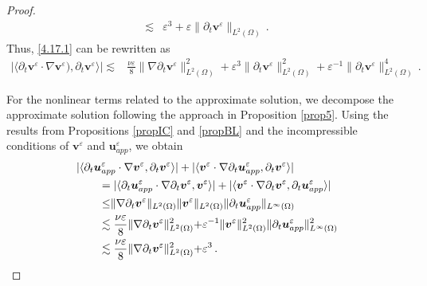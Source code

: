 \documentclass[pdflatex,sn-mathphys-num]{sn-jnl}%
\theoremstyle{thmstyleone}%
\theoremstyle{thmstyletwo}%
\theoremstyle{thmstylethree}%
\theoremstyle{thmstyletwo}
\begin{document}
\begin{proof}
\begin{align}
		\lesssim&\varepsilon^3 
		+
		\varepsilon 
		\lVert\partial_t\boldsymbol v^{\varepsilon}\rVert_{{L}^2(\Omega)}\,.
	\end{align} 
	Thus, \eqref{4.17.1} can be rewritten as
	\begin{align}\label{4.17.2}
		|\langle
		\partial_t{\boldsymbol v}^{\varepsilon} \cdot \nabla\boldsymbol{v}^\varepsilon)
		,\partial_t{\boldsymbol v}^{\varepsilon}\rangle|
		\lesssim&
		\frac{\nu\varepsilon}{8}
		\rVert
		\nabla\partial_t{\boldsymbol v}^{\varepsilon} 	\lVert^{2}_{{L}^2(\Omega)}
		+
		\varepsilon^{3}\lVert
		\partial_t{\boldsymbol v}^{\varepsilon} 	\rVert^{2}_{{L}^2(\Omega)}
		+
		\varepsilon^{-1}\lVert
		\partial_t{\boldsymbol v}^{\varepsilon} 	\rVert^{4}_{{L}^2(\Omega)}
		\,.
	\end{align}
	
	
	
	For the nonlinear terms related to the approximate solution, we decompose the approximate solution following the approach in Proposition \ref{prop5}. Using the results from Propositions \ref{propIC} and \ref{propBL} and the incompressible conditions of $\boldsymbol{v}^\varepsilon$ and $\boldsymbol{u}^\varepsilon_{app}$, we obtain
	\begin{align}\label{4.21.1}
		&|\langle
		\partial_t{\boldsymbol u}_{app}^{\varepsilon} \cdot \nabla\boldsymbol{v}^\varepsilon
		,\partial_t{\boldsymbol v}^{\varepsilon}\rangle|
		+
		|\langle{\boldsymbol v}^{\varepsilon} \cdot \nabla\partial_t\boldsymbol{u}^\varepsilon_{app},
		\partial_t{\boldsymbol v}^{\varepsilon}\rangle|	
		\notag\\
		&\qquad=|\langle
		\partial_t{\boldsymbol u}_{app}^{\varepsilon} \cdot \nabla\partial_t\boldsymbol{v}^\varepsilon
		,{\boldsymbol v}^{\varepsilon}\rangle|
		+
		|\langle{\boldsymbol v}^{\varepsilon} \cdot \nabla\partial_t{\boldsymbol v}^{\varepsilon},
		\partial_t\boldsymbol{u}^\varepsilon_{app}\rangle|	
		\notag\\
		&\qquad\leq
		\rVert
		\nabla\partial_t{\boldsymbol v}^{\varepsilon} 	\lVert_{{L}^2(\Omega)}
		\rVert
		{\boldsymbol v}^{\varepsilon} 	\lVert_{{L}^2(\Omega)}
		\rVert
		\partial_t\boldsymbol{u}^\varepsilon_{app}
		\lVert_{{L}^\infty(\Omega)}\notag\\
		&\qquad\lesssim
		\frac{\nu\varepsilon}{8}
		\rVert
		\nabla\partial_t{\boldsymbol v}^{\varepsilon} 	\lVert^{2}_{{L}^2(\Omega)}
		+
		\varepsilon^{-1}\rVert
		{\boldsymbol v}^{\varepsilon} 	\lVert^2_{{L}^2(\Omega)}
		\rVert
		\partial_t\boldsymbol{u}^\varepsilon_{app}\lVert^2_{{L}^\infty(\Omega)}
		\notag\\
		&\qquad\lesssim
		\frac{\nu\varepsilon}{8}
		\rVert
		\nabla\partial_t{\boldsymbol v}^{\varepsilon} 	\lVert^{2}_{{L}^2(\Omega)}
		+
		\varepsilon^3
		\,.
	\end{align}
	

\end{proof}
\end{document}
